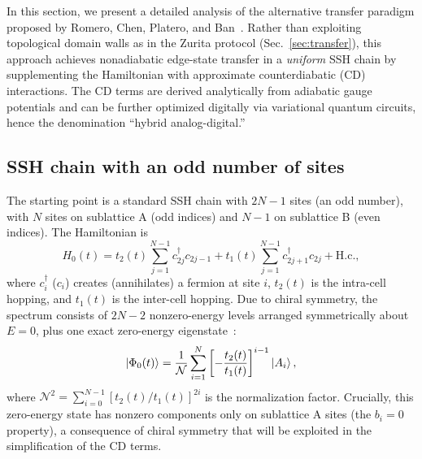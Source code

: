 \documentclass[
  reprint,
  amsmath,
  amssymb,
  aps,
  prb,
  longbibliography,
]{revtex4-2}
\begin{document}
In this section, we present a detailed analysis of the alternative transfer
paradigm proposed by Romero, Chen, Platero, and
Ban~\cite{Romero2024}. Rather than exploiting topological domain walls as
in the Zurita protocol (Sec.~\ref{sec:transfer}), this approach achieves
nonadiabatic edge-state transfer in a \emph{uniform} SSH chain by supplementing
the Hamiltonian with approximate counterdiabatic (CD) interactions. The CD
terms are derived analytically from adiabatic gauge potentials and can be
further optimized digitally via variational quantum circuits, hence the
denomination ``hybrid analog-digital.''

\subsection{SSH chain with an odd number of sites}
\label{sec:cd_ssh}

The starting point is a standard SSH chain with $2N - 1$ sites (an odd number),
with $N$ sites on sublattice A (odd indices) and $N - 1$ on sublattice B
(even indices). The Hamiltonian is~\cite{Romero2024}
\begin{equation}
  H_0(t) = t_2(t) \sum_{j=1}^{N-1} c_{2j}^\dagger c_{2j-1}
  + t_1(t) \sum_{j=1}^{N-1} c_{2j+1}^\dagger c_{2j} + \text{H.c.},
  \label{eq:H0_romero}
\end{equation}
where $c_i^\dagger$ ($c_i$) creates (annihilates) a fermion at site $i$,
$t_2(t)$ is the intra-cell hopping, and $t_1(t)$ is the inter-cell hopping.
Due to chiral symmetry, the spectrum consists of $2N - 2$ nonzero-energy
levels arranged symmetrically about $E = 0$, plus one exact zero-energy
eigenstate~\cite{Asboth2016}:
\begin{equation}
  \ket{\Phi_0(t)} = \frac{1}{\mathcal{N}} \sum_{i=1}^{N}
  \left[-\frac{t_2(t)}{t_1(t)}\right]^{i-1} \ket{A_i},
  \label{eq:zero_mode_romero}
\end{equation}
where $\mathcal{N}^2 = \sum_{i=0}^{N-1} [t_2(t)/t_1(t)]^{2i}$ is the
normalization factor. Crucially, this zero-energy state has nonzero components
only on sublattice A sites (the $b_i = 0$ property), a consequence of chiral
symmetry that will be exploited in the simplification of the CD terms.
\end{document}
